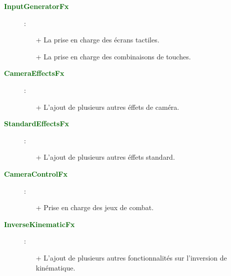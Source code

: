 \documentclass[a4paper, 11pt]{article}
\begin{document}
	\begin{description}
		\item [\textcolor{darkgreen}{\textbf{InputGeneratorFx}}]:
		\begin{itemize}
			\item[+] La prise en charge des écrans tactiles.
			\item[+] La prise en charge des combinaisons de touches.\\
		\end{itemize}
	\end{description}
	\begin{description}
		\item [\textcolor{darkgreen}{\textbf{CameraEffectsFx}}]:
		\begin{itemize}
			\item[+] L'ajout de plusieurs autres éffets de caméra.\\
		\end{itemize}
	\end{description}
	\begin{description}
		\item [\textcolor{darkgreen}{\textbf{StandardEffectsFx}}]:
		\begin{itemize}
			\item[+] L'ajout de plusieurs autres éffets standard.\\
		\end{itemize}
	\end{description}
	\begin{description}
		\item [\textcolor{darkgreen}{\textbf{CameraControlFx}}]:
		\begin{itemize}
			\item[+] Prise en charge des jeux de combat.\\
		\end{itemize}
	\end{description}
	\begin{description}
		\item [\textcolor{darkgreen}{\textbf{InverseKinematicFx}}]:
		\begin{itemize}
			\item[+] L'ajout de plusieurs autres fonctionnalités sur l'inversion de kinématique.\\
		\end{itemize}
	\end{description}
\end{document}
